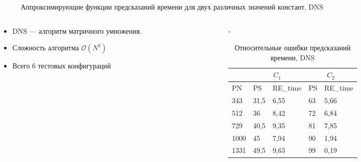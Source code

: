 \documentclass[unicode, t, 11pt]{beamer}%
\newlength{\mylen}
\begin{document}
\begin{frame}
				\begin{figure}
					\captionsetup{font=tiny, labelfont=tiny}
					\centering
					\caption{Аппроксимирующие функции предсказаний времени для двух различных значений констант, DNS}
				\end{figure}
				\begin{columns}[T]
					\setlength{\mylen}{0.4\textwidth}
					\begin{column}{\mylen}
						\begin{itemize}[label = \(\bullet\)]
					 		\item DNS — алгоритм матричного умножения.
					 		\item Сложность алгоритма \(\mathcal{O}(N^3)\)
					 		\item Всего 6 тестовых конфигураций
					 	\end{itemize}
					\end{column}
					\begin{column}{\dimexpr\textwidth-\mylen}
						\begin{table}
				 			\captionsetup{font=tiny, labelfont=tiny}
				 			\tiny
								\begin{tabularx}{\textwidth}{|X|X|X||X|X|}
								\hline
						             & \multicolumn{2}{c||}{\(C_1\)} & \multicolumn{2}{c|}{\(C_2\)} \\ \hline
						        PN   & PS   & RE\_time & PS & RE\_time          \\ \hline
						        343  & 31,5 & 6,55     & 63 & 5,66              \\ \hline
						        512  & 36   & 8,42     & 72 & 6,84              \\ \hline
						        729  & 40,5 & 9,35     & 81 & 7,85              \\ \hline
						        1000 & 45   & 7,94     & 90 & 1,94              \\ \hline
						        1331 & 49,5 & 9,63     & 99 & 0,19              \\ \hline
								\end{tabularx}
							\caption{Относительные ошибки предсказаний времени, DNS}
						\end{table}
					\end{column}
				\end{columns}
			\end{frame}
\end{document}
